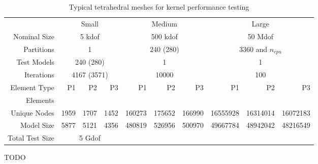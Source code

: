 \documentclass[]             %
{NASA}                       %
\begin{document}
\begin{table}[ht]%
\caption{Typical tetrahedral meshes for kernel performance testing}
\label{tab:advisor-meshes}
\begin{center}
\begin{tabular}{rrrrrrrrrr}
\toprule
& \multicolumn{3}{c}{Small} & \multicolumn{3}{c}{Medium} & \multicolumn{3}{c}{Large}\\
Nominal Size & \multicolumn{3}{c}{5 kdof} & \multicolumn{3}{c}{500 kdof} & \multicolumn{3}{c}{50 Mdof}\\
Partitions & \multicolumn{3}{c}{1} & \multicolumn{3}{c}{240 (280)} & \multicolumn{3}{c}{3360 and $n_{cpu}$}\\
Test Models & \multicolumn{3}{c}{240 (280)} & \multicolumn{3}{c}{1} & \multicolumn{3}{c}{1}\\
Iterations & \multicolumn{3}{c}{4167 (3571)} & \multicolumn{3}{c}{10000} & \multicolumn{3}{c}{100}\\
\cmidrule(lr){2-4}\cmidrule(lr){5-7}\cmidrule(lr){8-10}
Element Type & P1 & P2 & P3 & P1 & P2 & P3 & P1 & P2 & P3\\
Elements\\
Unique Nodes & 1959 & 1707 & 1452 & 160273 & 175652 & 166990 & 16555928 & 16314014 & 16072183\\
Model Size & 5877 & 5121 & 4356 & 480819 & 526956 & 500970 & 49667784 & 48942042 & 48216549\\
\cmidrule(lr){2-10}
Total Test Size & \multicolumn{3}{c}{5 Gdof} & & & & & &\\
\bottomrule
\end{tabular}
\end{center}
\end{table}

TODO

\end{document}
